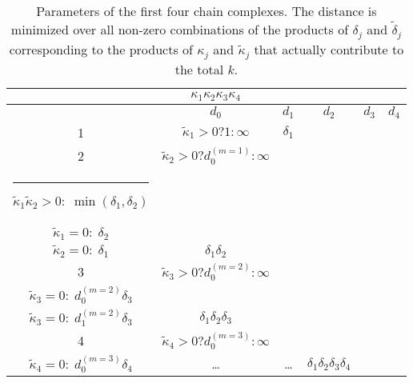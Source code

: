 \documentclass[aps,prb,12pt,tightenlines,%
notitlepage,longbibliography]{revtex4-1}
\begin{document}
\begin{turnpage}
\begin{table}[htbp]
\begin{tabular}[c]{c||c|c|c|c|c}
\begin{minipage}[c]{1.5in}
            \end{minipage} & ${\kappa}_1{\kappa}_2{\kappa}_3{\kappa}_4$
\\ \hline\hline 
    & $d_0$ & $d_1$ & $d_2$ & $d_3$ & $d_4$ \\ \hline 
1 & $\tilde{\kappa}_1>0? 1:\infty$ & $\delta_1$ & & &  \\ \hline 
2 & $\tilde{\kappa}_2>0? d_0^{(m=1)}:\infty$
                                 &   \begin{minipage}[c]{2.5in}
                   $\tilde{\kappa}_2>0?
                   \min\biglb(d_1^{(1)},d_0^{(1)}\delta_2\bigrb):d_0^{(1)}\delta_2
                   {}_{\strut}^{\strut}$\\
                   \hrule{\hfill}                 
                   $\tilde{\kappa}_1\tilde{\kappa}_2>0:  \;  
                   \min({\delta}_1,\delta_2)$\hfill\strut\\
                   $\tilde{\kappa}_1=0:  \;
                   \delta_2$\hfill\strut\\
                   $\tilde{\kappa}_2=0:  \;
                   \delta_1$\hfill\strut
                 \end{minipage}
    & $\delta_1\delta_2$ &  \\ \hline 
    3&  $\tilde{\kappa}_3>0? d_0^{(m=2)}:\infty$ &   \begin{minipage}[c]{2.2in}
                   $\tilde{\kappa}_3>0:  \;  
                   \min(d_1^{(m=2)},d_0^{(m=2)}\delta_3)$\hfill\strut\\
                   $\tilde{\kappa}_3=0:  \;
                   d_0^{(m=2)}\delta_3$\hfill\strut
                 \end{minipage} 
    &   \begin{minipage}[c]{2.1in}
      $\tilde{\kappa}_3>0:  \;  
      \min(d_2^{(m=2)},d_1^{(m=2)}\delta_3)$\hfill\strut\\
      $\tilde{\kappa}_3=0:  \;
      d_1^{(m=2)}\delta_3$\hfill\strut
    \end{minipage} & $\delta_1\delta_2\delta_3$
\\ \hline 
    4 & $\tilde{\kappa}_4>0? d_0^{(m=3)}:\infty$ &  \begin{minipage}[c]{2.1in}
      $\tilde{\kappa}_4>0:  \;  
      \min(d_1^{(m=3)},d_0^{(m=3)}\delta_4)$\hfill\strut\\
      $\tilde{\kappa}_4=0:  \;
      d_0^{(m=3)}\delta_4$\hfill\strut
    \end{minipage} & \ldots & \ldots & $\delta_1\delta_2\delta_3\delta_4$
  \end{tabular}
  \caption{Parameters of the first four chain complexes.  The distance
    is minimized over all
    non-zero combinations of the products of $\delta_j$ and
    $\tilde{\delta}_j$ corresponding to the products of $\kappa_j$ and $\tilde{\kappa}_j$
    that actually contribute to the total $k$.}
  \label{tab:params}
\end{table}
\end{turnpage}
\end{document}
